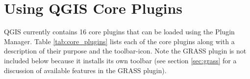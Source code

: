 \section{Using QGIS Core Plugins}\label{sec:core_plugins}

\updatedisclaimer

QGIS currently contains 16 core plugins that can be loaded using the Plugin Manager.
Table \ref{tab:core_plugins} lists each of the core plugins along with a description of their purpose and the toolbar-icon.
Note the GRASS plugin is not included below because it installs its own toolbar (see section \ref{sec:grass} for a discussion of available features in the GRASS plugin).

